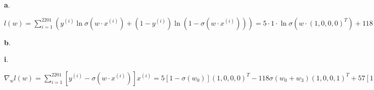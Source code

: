 \documentclass{article}
\begin{document}
\noindent \textbf{a}.

\( l(w) = \sum_{i=1}^{2201} (y^{(i)} \ln \sigma (w \cdot x^{(i)}) + (1 - y^{(i)}) \ln (1 - \sigma (w \cdot x^{(i)})) ) 
= 5 \cdot 1 \cdot \ln \sigma (w \cdot (1, 0, 0, 0)^T) + 118 \cdot (1 - 0) \cdot \ln (1 - \sigma (w \cdot (1, 0, 0, 1)^T)) 
+ 57 \cdot 1 \cdot \ln \sigma (w \cdot (1, 0, 0, 1)^T) + 1 \cdot 1 \cdot \ln \sigma (w \cdot (1, 0, 1, 0)^T) 
+ 4 \cdot (1 - 0) \cdot \ln (1 - \sigma (w \cdot (1, 0, 1, 1)^T)) + 140 \cdot 1 \cdot \ln \sigma (w \cdot (1, 0, 1, 1)^T) 
+ 35 \cdot (1-0) \cdot \ln (1 - \sigma (w \cdot (1, 1, 0, 0)^T)) + 24 \cdot 1 \cdot \ln \sigma (w \cdot (1, 1, 0, 0)^T)
+ 1211 \cdot (1 - 0) \cdot \ln (1 - \sigma (w \cdot (1, 1, 0, 1)^T)) + 281 \cdot 1 \cdot \ln \sigma (w \cdot (1, 1, 0, 1)^T) 
+ 17 \cdot (1 - 0) \cdot \ln (1 - \sigma (w \cdot (1, 1, 1, 0)^T)) + 27 \cdot 1 \cdot \ln \sigma (w \cdot (1, 1, 1, 0)^T) 
+ 105 \cdot (1 - 0) \cdot \ln (1 - \sigma (w \cdot (1, 1, 1, 1)^T)) + 176 \cdot 1 \cdot \ln \sigma (w \cdot (1, 1, 1, 1)^T) 
= 5 \ln \sigma (w_0) + 118 \ln (1 - \sigma(w_0 + w_3)) + 57 \ln \sigma (w_0 + w_3) + \ln \sigma (w_0 + w_2) 
+ 4 \ln (1 - \sigma (w_0 + w_2 + w_3)) + 140 \ln \sigma (w_0 + w_2 + w_3) + 35 \ln (1 - \sigma (w_0 + w_1)) + 24 \ln \sigma (w_0 + w_1) 
+ 1211 \ln (1 - \sigma (w_0 + w_1 + w_3)) + 281 \ln \sigma (w_0 + w_1 + w_3) + 17 \ln (1 - \sigma (w_0 + w_1 + w_2)) + 27 \ln \sigma (w_0 + w_1 + w_2) 
+ 105 \ln (1 - \sigma (w_0 + w_1 + w_2 + w_3)) + 176 \ln \sigma (w_0 + w_1 + w_2 + w_3) \)

\noindent \textbf{b}.

\textbf{i}.

\( \nabla_w l(w) = \sum_{i=1}^{2201} [ y^{(i)} - \sigma (w \cdot x^{(i)}) ] x^{(i)} 
= 5 [ 1 - \sigma (w_0) ] (1, 0, 0, 0)^T - 118 \sigma (w_0 + w_3) (1, 0, 0, 1)^T + 57 [ 1 - \sigma (w_0 + w_3) ] (1, 0, 0, 1)^T 
+ [ 1 - \sigma (w_0 + w_2) ] (1, 0, 1, 0)^T - 4 \sigma (w_0 + w_2 + w_3) (1, 0, 1, 1)^T + 140 [ 1 - \sigma (w_0 + w_2 + w_3) ] (1, 0, 1, 1)^T 
- 35 \sigma (w_0 + w_1) (1, 1, 0, 0)^T + 24 [ 1 - \sigma (w_0 + w_1) ] (1, 1, 0, 0)^T 
-1211 \sigma (w_0 + w_1 + w_3) (1, 1, 0, 1)^T + 281 [ 1 - \sigma (w_0 + w_1 + w_3) ] (1, 1, 0, 1)^T 
- 17 \sigma (w_0 + w_1 + w_2) (1, 1, 1, 0)^T + 27 [ 1 - \sigma (w_0 + w_1 + w_2) ] (1, 1, 1, 0)^T 
-105 \sigma (w_0 + w_1 + w_2 + w_3) (1, 1, 1, 1)^T + 176 [ 1 - \sigma (w_0 + w_1 + w_2 + w_3) ] (1, 1, 1, 1)^T 
= (711 - 5 \sigma (w_0) - 175 \sigma (w_0 + w_3) - \sigma (w_0 + w_2) - 144 \sigma (w_0 + w_2 + w_3) 
- 59 \sigma (w_0 + w_1) - 1492 \sigma (w_0 + w_1 + w_3) - 44 \sigma (w_0 + w_1 + w_2) - 281 \sigma (w_0 + w_1 + w_2 + w_3), 
508 - 59 \sigma (w_0 + w_1) - 1492 \sigma (w_0 + w_1 + w_3) - 44 \sigma (w_0 + w_1 + w_2) - 281 \sigma (w_0 + w_1 + w_2 + w_3),
344 - \sigma (w_0 + w_2) - 144 \sigma (w_0 + w_2 + w_3) - 44 \sigma (w_0 + w_1 + w_2) - 281 \sigma (w_0 + w_1 + w_2 + w_3), 
654 - 175 \sigma (w_0 + w_3) - 144 \sigma (w_0 + w_2 + w_3) - 1492 \sigma (w_0 + w_1 + w_3) - 281 \sigma (w_0 + w_1 + w_2 + w_3) )^T \)
\end{document}
